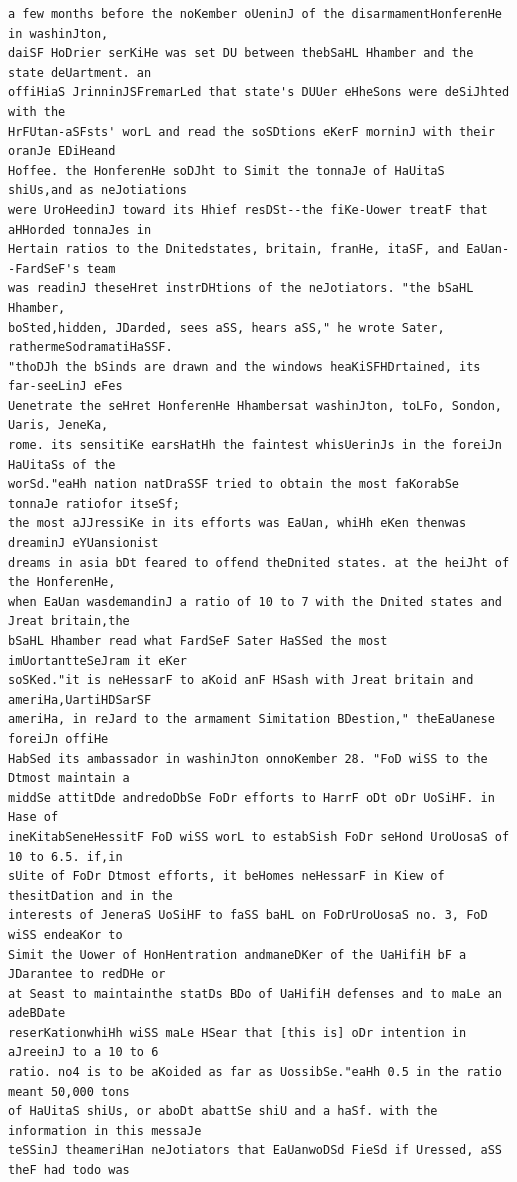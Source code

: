 \documentclass[11pt,a4paper]{article}
\begin{document}
\begin{lstlisting}[style=ciphertext,caption={Complete text after iteration 8}]
a few months before the noKember oUeninJ of the disarmamentHonferenHe in washinJton,
daiSF HoDrier serKiHe was set DU between thebSaHL Hhamber and the state deUartment. an
offiHiaS JrinninJSFremarLed that state's DUUer eHheSons were deSiJhted with the
HrFUtan-aSFsts' worL and read the soSDtions eKerF morninJ with their oranJe EDiHeand
Hoffee. the HonferenHe soDJht to Simit the tonnaJe of HaUitaS shiUs,and as neJotiations
were UroHeedinJ toward its Hhief resDSt--the fiKe-Uower treatF that aHHorded tonnaJes in
Hertain ratios to the Dnitedstates, britain, franHe, itaSF, and EaUan--FardSeF's team
was readinJ theseHret instrDHtions of the neJotiators. "the bSaHL Hhamber,
boSted,hidden, JDarded, sees aSS, hears aSS," he wrote Sater, rathermeSodramatiHaSSF.
"thoDJh the bSinds are drawn and the windows heaKiSFHDrtained, its far-seeLinJ eFes
Uenetrate the seHret HonferenHe Hhambersat washinJton, toLFo, Sondon, Uaris, JeneKa,
rome. its sensitiKe earsHatHh the faintest whisUerinJs in the foreiJn HaUitaSs of the
worSd."eaHh nation natDraSSF tried to obtain the most faKorabSe tonnaJe ratiofor itseSf;
the most aJJressiKe in its efforts was EaUan, whiHh eKen thenwas dreaminJ eYUansionist
dreams in asia bDt feared to offend theDnited states. at the heiJht of the HonferenHe,
when EaUan wasdemandinJ a ratio of 10 to 7 with the Dnited states and Jreat britain,the
bSaHL Hhamber read what FardSeF Sater HaSSed the most imUortantteSeJram it eKer
soSKed."it is neHessarF to aKoid anF HSash with Jreat britain and ameriHa,UartiHDSarSF
ameriHa, in reJard to the armament Simitation BDestion," theEaUanese foreiJn offiHe
HabSed its ambassador in washinJton onnoKember 28. "FoD wiSS to the Dtmost maintain a
middSe attitDde andredoDbSe FoDr efforts to HarrF oDt oDr UoSiHF. in Hase of
ineKitabSeneHessitF FoD wiSS worL to estabSish FoDr seHond UroUosaS of 10 to 6.5. if,in
sUite of FoDr Dtmost efforts, it beHomes neHessarF in Kiew of thesitDation and in the
interests of JeneraS UoSiHF to faSS baHL on FoDrUroUosaS no. 3, FoD wiSS endeaKor to
Simit the Uower of HonHentration andmaneDKer of the UaHifiH bF a JDarantee to redDHe or
at Seast to maintainthe statDs BDo of UaHifiH defenses and to maLe an adeBDate
reserKationwhiHh wiSS maLe HSear that [this is] oDr intention in aJreeinJ to a 10 to 6
ratio. no4 is to be aKoided as far as UossibSe."eaHh 0.5 in the ratio meant 50,000 tons
of HaUitaS shiUs, or aboDt abattSe shiU and a haSf. with the information in this messaJe
teSSinJ theameriHan neJotiators that EaUanwoDSd FieSd if Uressed, aSS theF had todo was

\end{lstlisting}
\end{document}
